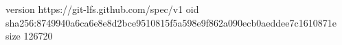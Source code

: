 version https://git-lfs.github.com/spec/v1
oid sha256:8749940a6ca6e8e8d2bce9510815f5a598e9f862a090ecb0aeddee7c1610871e
size 126720
